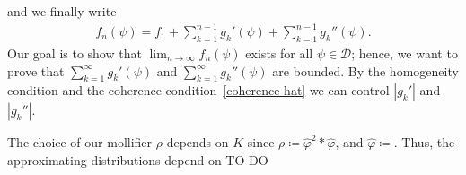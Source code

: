 and we finally write 
\begin{align}\label{approximating-distributions-alternative}
    f_n(\psi) = f_1 + \sum^{n-1}_{k=1} g_k'(\psi) + \sum^{n-1}_{k=1} g_k''(\psi).
\end{align}
Our goal is to show that \(\lim_{n \to \infty}f_n(\psi)\) exists for all \(\psi \in \mathcal{D}\); hence, we want to prove that \( \sum^{\infty}_{k=1} g_k'(\psi)\) and \( \sum^{\infty}_{k=1} g_k''(\psi)\) are bounded. By the homogeneity condition and the coherence condition~\eqref{coherence-hat} we can control \(|g_k'|\) and \(|g_k''|\).

\begin{remark}\label{remark:fk-depends}
    The choice of our mollifier \(\rho\) depends on \(K\) since \(\rho \coloneqq \hat \varphi^2 * \hat \varphi\), and \(\hat \varphi \coloneqq \). Thus, the approximating distributions depend on TO-DO
\end{remark}

